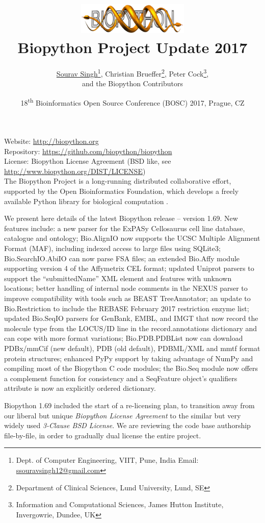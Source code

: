 \documentclass[10pt,oneside]{article}
\title{%
\vspace{-1.5in}
\includegraphics[width=0.4\textwidth]{biopython.jpg}\\
\vspace{3mm}Biopython Project Update 2017}
\author{
	\underline{Sourav Singh}\thanks{Dept. of Computer Engineering, VIIT, Pune, India Email: \href{mailto:ssouravsingh12@gmail.com}{ssouravsingh12@gmail.com}},
    Christian Brueffer\thanks{Department of Clinical Sciences, Lund University, Lund, SE},
    Peter Cock\thanks{Information and Computational Sciences, James Hutton Institute, Invergowrie, Dundee, UK},\\
    and the Biopython Contributors}
\date{18\textsuperscript{th} Bioinformatics Open Source Conference (BOSC) 2017, Prague, CZ}
\begin{document}
\maketitle
\thispagestyle{empty}

\vspace{-0.2in}
\noindent
Website: \url{http://biopython.org} \\
Repository: \url{https://github.com/biopython/biopython} \\
License: Biopython License Agreement (BSD like, see \url{http://www.biopython.org/DIST/LICENSE}) \\

The Biopython Project is a long-running distributed collaborative effort,
supported by the Open Bioinformatics Foundation, which develops a freely
available Python library for biological computation \cite{AppNote}.

We present here details of the latest Biopython release -- version 1.69.
New features include: a new parser for the ExPASy Cellosaurus cell line
database, catalogue and ontology; Bio.AlignIO now supports the UCSC Multiple
Alignment Format (MAF), including indexed access to large files using SQLite3;
Bio.SearchIO.AbiIO can now parse FSA files; an extended Bio.Affy module supporting
version 4 of the Affymetrix CEL format; updated Uniprot parsers to support
the ``submittedName'' XML element and features with unknown locations; better
handling of internal node comments in the NEXUS parser to improve compatibility
with tools such as BEAST TreeAnnotator; an update to Bio.Restriction to include
the REBASE February 2017 restriction enzyme list; updated Bio.SeqIO parsers for
GenBank, EMBL, and IMGT that now record the molecule type from the LOCUS/ID line
in the record.annotations dictionary and can cope with more format variations;
Bio.PDB.PDBList now can download PDBx/mmCif (new default), PDB (old default),
PDBML/XML and mmtf format protein structures; enhanced PyPy support by taking
advantage of NumPy and compiling most of the Biopython C code modules; the Bio.Seq
module now offers a complement function for consistency and a SeqFeature object's
qualifiers attribute is now an explicitly ordered dictionary.

Biopython 1.69 included the start of a re-licensing plan, to transition away
from our liberal but unique \emph{Biopython License Agreement} to the similar
but very widely used \emph{3-Clause BSD License}. We are reviewing the code
base authorship file-by-file, in order to gradually dual license the entire
project.
\end{document}
